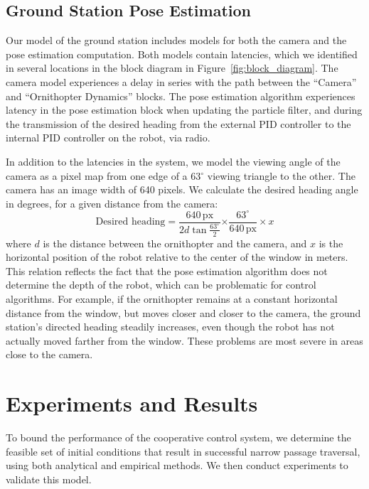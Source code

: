 \documentclass{aamas2013}
\begin{document}
\subsection{Ground Station Pose Estimation}

Our model of the ground station includes models for both the camera and the
pose estimation computation. Both models contain latencies, which we
identified in several locations in the block diagram in
Figure~\ref{fig:block_diagram}. The camera model experiences a delay in series
with the path between the ``Camera'' and ``Ornithopter Dynamics'' blocks. The
pose estimation algorithm experiences latency in the pose estimation block
when updating the particle filter, and during the transmission of the desired
heading from the external PID controller to the internal PID controller on
the robot, via radio.
 
In addition to the latencies in the system, we model the viewing angle of the
camera as a pixel map from one edge of a 63$^{\circ}$ viewing triangle to the
other. The camera has an image width of 640 pixels. We calculate the desired
heading angle in degrees, for a given distance from the camera:
\begin{equation} 
\label{eq:desired_heading} 
\text{Desired heading} = \frac{640\,\text{px}}{2d\tan{\frac{63^{\circ}}{2}}}{\times\frac{63^{\circ}}{640\,\text{px}}\times x}
\end{equation}
where $d$ is the distance between the ornithopter and the camera, and $x$ is 
the horizontal position of the robot relative to the center of the window in 
meters. This relation reflects the fact that the pose estimation algorithm 
does not determine the depth of the robot, which can be problematic for 
control algorithms. For example, if the ornithopter remains at a constant 
horizontal distance from the window, but moves closer and closer to the 
camera, the ground station's directed heading steadily increases, even 
though the robot has not actually moved farther from the window. These 
problems are most severe in areas close to the camera.


\section{Experiments and Results}
\label{sec:performance}
To bound the performance of the cooperative control system, we determine 
the feasible set of initial conditions that result in successful narrow 
passage traversal, using both analytical and empirical methods. We then 
conduct experiments to validate this model.
\end{document}

